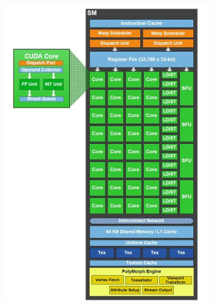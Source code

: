 \documentclass[sans,mathserif]{beamer}
\begin{document}
\begin{frame}
  \includegraphics[height=\textheight]{gpu_sm.jpg}
\end{frame}
\end{document}
